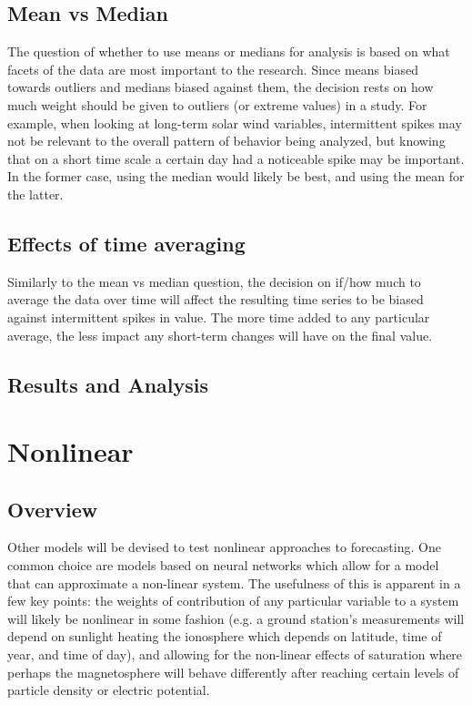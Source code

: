 \subsection{Mean vs Median}
The question of whether to use means or medians for analysis is based on what facets of the data are most important to the research. Since means biased towards outliers and medians biased against them, the decision rests on how much weight should be given to outliers (or extreme values) in a study. For example, when looking at long-term solar wind variables, intermittent spikes may not be relevant to the overall pattern of behavior being analyzed, but knowing that on a short time scale a certain day had a noticeable spike may be important. In the former case, using the median would likely be best, and using the mean for the latter. 

\subsection{Effects of time averaging}
Similarly to the mean vs median question, the decision on if/how much to average the data over time will affect the resulting time series to be biased against intermittent spikes in value. The more time added to any particular average, the less impact any short-term changes will have on the final value.

\subsection{Results and Analysis}

\section{Nonlinear}

\subsection{Overview}

Other models will be devised to test nonlinear approaches to forecasting. One common choice are models based on neural networks \cite{NNARMA,ANNforecast} which allow for a model that can approximate a non-linear system. The usefulness of this is apparent in a few key points: the weights of contribution of any particular variable to a system will likely be nonlinear in some fashion (e.g. a ground station's measurements will depend on sunlight heating the ionosphere which depends on latitude, time of year, and time of day), and allowing for the non-linear effects of saturation where perhaps the magnetosphere will behave differently after reaching certain levels of particle density or electric potential.

